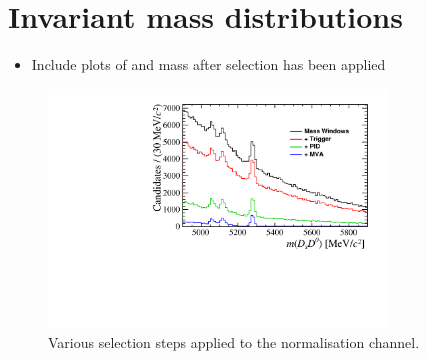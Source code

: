 \section{Invariant mass distributions}

{\color{Red}
\begin{itemize}
\item Include plots of \Ds and \Kp\Km mass after selection has been applied 
\end{itemize}
}

\begin{figure}[!h]
    \centering
        \includegraphics[width=0.8\textwidth]{figs/Selection/Normalisation_with_sel_B2DsD0.pdf}
    \caption{Various selection steps applied to the normalisation channel.}
    \label{fig:norm_selection}   
\end{figure}


